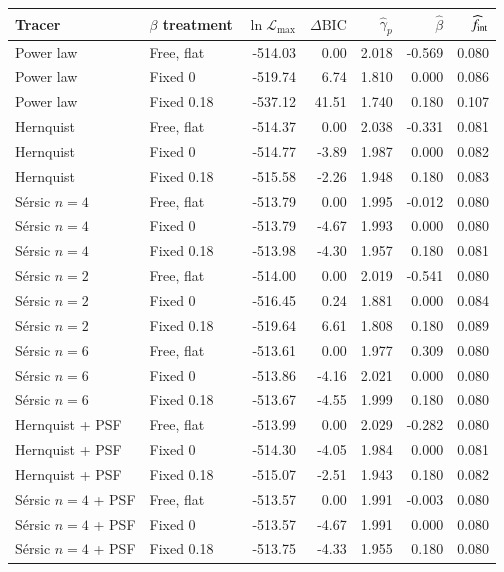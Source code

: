 \begin{tabular}{llrrrrr}
\toprule
Tracer & $\beta$ treatment & $\ln\mathcal L_{\max}$ & $\Delta\mathrm{BIC}$ & $\widehat\gamma_p$ & $\widehat\beta$ & $\widehat f_{\rm int}$ \\
\midrule
Power law & Free, flat & -514.03 & 0.00 & 2.018 & -0.569 & 0.080 \\
Power law & Fixed 0 & -519.74 & 6.74 & 1.810 & 0.000 & 0.086 \\
Power law & Fixed 0.18 & -537.12 & 41.51 & 1.740 & 0.180 & 0.107 \\
Hernquist & Free, flat & -514.37 & 0.00 & 2.038 & -0.331 & 0.081 \\
Hernquist & Fixed 0 & -514.77 & -3.89 & 1.987 & 0.000 & 0.082 \\
Hernquist & Fixed 0.18 & -515.58 & -2.26 & 1.948 & 0.180 & 0.083 \\
S\'ersic $n=4$ & Free, flat & -513.79 & 0.00 & 1.995 & -0.012 & 0.080 \\
S\'ersic $n=4$ & Fixed 0 & -513.79 & -4.67 & 1.993 & 0.000 & 0.080 \\
S\'ersic $n=4$ & Fixed 0.18 & -513.98 & -4.30 & 1.957 & 0.180 & 0.081 \\
S\'ersic $n=2$ & Free, flat & -514.00 & 0.00 & 2.019 & -0.541 & 0.080 \\
S\'ersic $n=2$ & Fixed 0 & -516.45 & 0.24 & 1.881 & 0.000 & 0.084 \\
S\'ersic $n=2$ & Fixed 0.18 & -519.64 & 6.61 & 1.808 & 0.180 & 0.089 \\
S\'ersic $n=6$ & Free, flat & -513.61 & 0.00 & 1.977 & 0.309 & 0.080 \\
S\'ersic $n=6$ & Fixed 0 & -513.86 & -4.16 & 2.021 & 0.000 & 0.080 \\
S\'ersic $n=6$ & Fixed 0.18 & -513.67 & -4.55 & 1.999 & 0.180 & 0.080 \\
Hernquist + PSF & Free, flat & -513.99 & 0.00 & 2.029 & -0.282 & 0.080 \\
Hernquist + PSF & Fixed 0 & -514.30 & -4.05 & 1.984 & 0.000 & 0.081 \\
Hernquist + PSF & Fixed 0.18 & -515.07 & -2.51 & 1.943 & 0.180 & 0.082 \\
S\'ersic $n=4$ + PSF & Free, flat & -513.57 & 0.00 & 1.991 & -0.003 & 0.080 \\
S\'ersic $n=4$ + PSF & Fixed 0 & -513.57 & -4.67 & 1.991 & 0.000 & 0.080 \\
S\'ersic $n=4$ + PSF & Fixed 0.18 & -513.75 & -4.33 & 1.955 & 0.180 & 0.080 \\
\bottomrule
\end{tabular}
